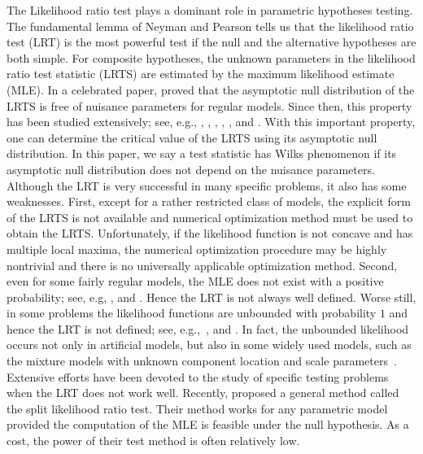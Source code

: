 \documentclass[11pt]{article}
\theoremstyle{plain}
\theoremstyle{definition}
\theoremstyle{remark}
\begin{document}
The Likelihood ratio test plays a dominant role in parametric hypotheses testing.
The fundamental lemma of Neyman and Pearson tells us that the likelihood ratio test (LRT) is the most powerful test if the null and the alternative hypotheses are both simple.
For composite hypotheses, the unknown parameters in the likelihood ratio test statistic (LRTS) are estimated by the maximum likelihood estimate (MLE).
In a celebrated paper, \citep{Wilks1938The} proved that the asymptotic null distribution of the LRTS is free of nuisance parameters for regular models.
Since then, this property has been studied extensively; see, e.g., \cite{Hogg1956On}, \cite{Self1987Asymptotic} \cite{portnoy1988asymptotic}, \cite{Fan2000}, \cite{Fan2001}, \cite{Drton2009Likelihood}, \cite{Sur2019The} and \cite{Anastasiou2020Bounds}.
With this important property, one can determine the critical value of the LRTS using its asymptotic null distribution.
In this paper, we say a test statistic has Wilks phenomenon if its asymptotic null distribution does not depend on the nuisance parameters.
Although the LRT is very successful in many specific problems, it also has some weaknesses.
First, except for a rather restricted class of models, the explicit form of the LRTS is not available and numerical optimization method must be used to obtain the LRTS.
Unfortunately, if the likelihood function is not concave and has multiple local maxima,
the numerical optimization procedure may be highly nontrivial and there is no universally applicable optimization method.
Second, even for some fairly regular models,
the MLE does not exist with a positive probability; see, e.g, \cite{Fienberg2012}, \cite{Rinaldo2013} and \cite{Candes2020The_phase}.
Hence the LRT is not always well defined.
Worse still, in some problems the likelihood functions are unbounded with probability $1$ and hence the LRT is not defined; see, e.g.,~\cite{Wim1981A}, \cite{Cam1990Maximum} and \cite{Liu2015Understanding}.
In fact, the unbounded likelihood occurs not only in artificial models, but also in some widely used models, such as the mixture models with unknown component location and scale parameters~\citep{chenjiahua2017}.
Extensive efforts have been devoted to the study of specific testing problems when the LRT does not work well.
Recently, \cite{Wasserman2020} proposed a general method called the split likelihood ratio test.
Their method works for any parametric model provided the computation of the MLE is feasible under the null hypothesis.
As a cost, the power of their test method is often relatively low.
\end{document}
